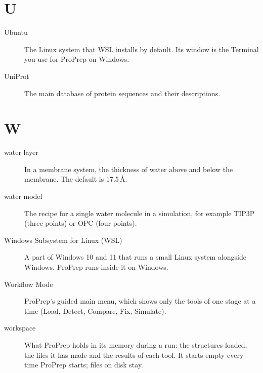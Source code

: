 \section*{U}

\begin{description}
\item[Ubuntu] The Linux system that WSL installs by default. Its window is the
  Terminal you use for ProPrep on Windows.
\item[UniProt] The main database of protein sequences and their descriptions.
\end{description}

\section*{W}

\begin{description}
\item[water layer] In a membrane system, the thickness of water above and
  below the membrane. The default is 17.5\,Å.
\item[water model] The recipe for a single water molecule in a simulation,
  for example TIP3P (three points) or OPC (four points).
\item[Windows Subsystem for Linux (WSL)] A part of Windows 10 and 11 that runs
  a small Linux system alongside Windows. ProPrep runs inside it on Windows.
\item[Workflow Mode] ProPrep's guided main menu, which shows only the tools of
  one stage at a time (Load, Detect, Compare, Fix, Simulate).
\item[workspace] What ProPrep holds in its memory during a run: the
  structures loaded, the files it has made and the results of each tool. It
  starts empty every time ProPrep starts; files on disk stay.
\end{description}
\endgroup
